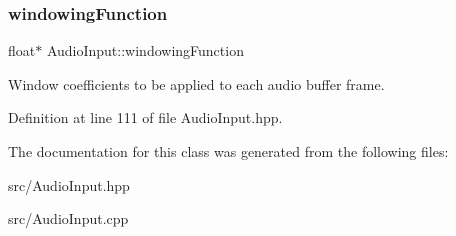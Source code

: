 \subsubsection{\texorpdfstring{windowing\+Function}{windowingFunction}}
{\footnotesize\ttfamily float$\ast$ Audio\+Input\+::windowing\+Function\hspace{0.3cm}{\ttfamily [protected]}}

Window coefficients to be applied to each audio buffer frame. 

Definition at line 111 of file Audio\+Input.\+hpp.



The documentation for this class was generated from the following files\+:\begin{DoxyCompactItemize}
\item 
src/Audio\+Input.\+hpp\item 
src/Audio\+Input.\+cpp\end{DoxyCompactItemize}
